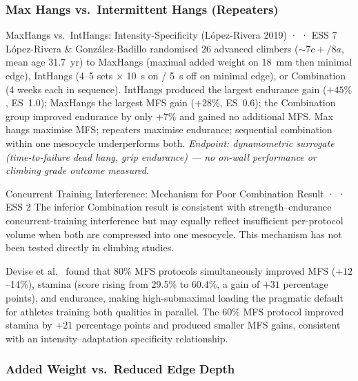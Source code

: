 \subsubsection{Max Hangs vs.\ Intermittent Hangs (Repeaters)}
\label{sec:maxvsrep}

\begin{evidencebox}{MaxHangs vs.\ IntHangs: Intensity-Specificity (López-Rivera 2019) · \evidencebacked · ESS 7}
López-Rivera \& González-Badillo \cite{LRGB19} randomised 26 advanced climbers (${\sim}7c{+}/8a$, mean age 31.7~yr) to MaxHangs (maximal added weight on 18~mm then minimal edge), IntHangs (4--5 sets $\times$ 10~s on / 5~s off on minimal edge), or Combination (4 weeks each in sequence). IntHangs produced the largest endurance gain ($+45\%$, ES~1.0); MaxHangs the largest MFS gain ($+28\%$, ES~0.6); the Combination group improved endurance by only $+7\%$ and gained no additional MFS. Max hangs maximise MFS; repeaters maximise endurance; sequential combination within one mesocycle underperforms both. \textit{Endpoint: dynamometric surrogate (time-to-failure dead hang, grip endurance) — no on-wall performance or climbing grade outcome measured.}
\end{evidencebox}

\begin{bioplausbox}{Concurrent Training Interference: Mechanism for Poor Combination Result · \bioplausible · ESS 2}
The inferior Combination result is consistent with strength--endurance concurrent-training interference but may equally reflect insufficient per-protocol volume when both are compressed into one mesocycle. This mechanism has not been tested directly in climbing studies.
\end{bioplausbox}

Devise et al.\ \cite{DO22} found that 80\% MFS protocols simultaneously improved MFS ($+12$--14\%), stamina (score rising from 29.5\% to 60.4\%, a gain of $+31$ percentage points), and endurance, making high-submaximal loading the pragmatic default for athletes training both qualities in parallel. The 60\% MFS protocol improved stamina by $+21$ percentage points and produced smaller MFS gains, consistent with an intensity--adaptation specificity relationship.

\subsubsection{Added Weight vs.\ Reduced Edge Depth}

